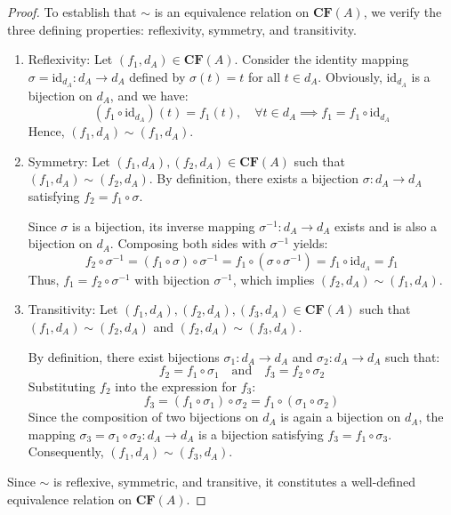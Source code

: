 \documentclass[a4paper,12pt, twoside]{memoir}
\begin{document}
\begin{proof}
	To establish that $\sim$ is an equivalence relation on $\mathbf{CF}(A)$, we verify the three defining properties: reflexivity, symmetry, and transitivity.

	\begin{enumerate}[leftmargin=*]
		\item Reflexivity:
		      Let $(f_1, d_A) \in \mathbf{CF}(A)$. Consider the identity mapping $\sigma = \text{id}_{d_A} : d_A \to d_A$ defined by $\sigma(t) = t$ for all $t \in d_A$. Obviously, $\text{id}_{d_A}$ is a bijection on $d_A$, and we have:
		      \[
			      (f_1 \circ \text{id}_{d_A})(t) = f_1(t), \quad \forall t \in d_A \implies f_1 = f_1 \circ \text{id}_{d_A}
		      \]
		      Hence, $(f_1, d_A) \sim (f_1, d_A)$.

		\item Symmetry:
		      Let $(f_1, d_A), (f_2, d_A) \in \mathbf{CF}(A)$ such that $(f_1, d_A) \sim (f_2, d_A)$. By definition, there exists a bijection $\sigma : d_A \to d_A$ satisfying $f_2 = f_1 \circ \sigma$.

		      Since $\sigma$ is a bijection, its inverse mapping $\sigma^{-1} : d_A \to d_A$ exists and is also a bijection on $d_A$. Composing both sides with $\sigma^{-1}$ yields:
		      \[
			      f_2 \circ \sigma^{-1} = (f_1 \circ \sigma) \circ \sigma^{-1} = f_1 \circ (\sigma \circ \sigma^{-1}) = f_1 \circ \text{id}_{d_A} = f_1
		      \]
		      Thus, $f_1 = f_2 \circ \sigma^{-1}$ with bijection $\sigma^{-1}$, which implies $(f_2, d_A) \sim (f_1, d_A)$.

		\item Transitivity:
		      Let $(f_1, d_A), (f_2, d_A), (f_3, d_A) \in \mathbf{CF}(A)$ such that $(f_1, d_A) \sim (f_2, d_A)$ and $(f_2, d_A) \sim (f_3, d_A)$.

		      By definition, there exist bijections $\sigma_1 : d_A \to d_A$ and $\sigma_2 : d_A \to d_A$ such that:
		      \[
			      f_2 = f_1 \circ \sigma_1 \quad \text{and} \quad f_3 = f_2 \circ \sigma_2
		      \]
		      Substituting $f_2$ into the expression for $f_3$:
		      \[
			      f_3 = (f_1 \circ \sigma_1) \circ \sigma_2 = f_1 \circ (\sigma_1 \circ \sigma_2)
		      \]
		      Since the composition of two bijections on $d_A$ is again a bijection on $d_A$, the mapping $\sigma_3 = \sigma_1 \circ \sigma_2 : d_A \to d_A$ is a bijection satisfying $f_3 = f_1 \circ \sigma_3$. Consequently, $(f_1, d_A) \sim (f_3, d_A)$.
	\end{enumerate}

	Since $\sim$ is reflexive, symmetric, and transitive, it constitutes a well-defined equivalence relation on $\mathbf{CF}(A)$.
\end{proof}
\end{document}
